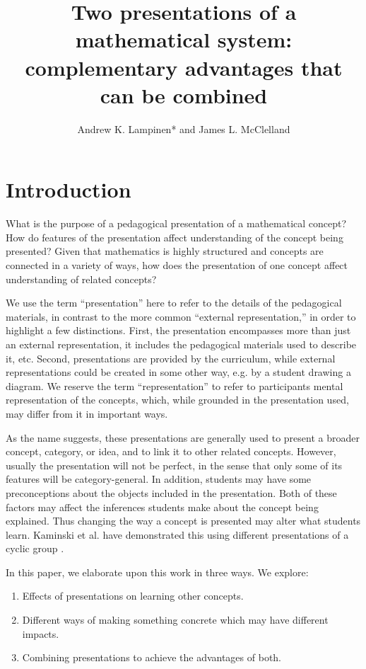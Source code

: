\documentclass[man,10pt]{apa6}
\title{Two presentations of a mathematical system: complementary advantages that can be combined}
\author{Andrew K. Lampinen* and James L. McClelland}
\affiliation{Department of Psychology, Stanford University}
\date{}
\begin{document}
\maketitle
\section{Introduction}
What is the purpose of a pedagogical presentation of a mathematical concept? How do features of the presentation affect understanding of the concept being presented? Given that mathematics is highly structured and concepts are connected in a variety of ways, how does the presentation of one concept affect understanding of related concepts?  \par
We use the term ``presentation'' here to refer to the details of the pedagogical materials, in contrast to the more common ``external representation,'' in order to highlight a few distinctions. First, the presentation encompasses more than just an external representation, it includes the pedagogical materials used to describe it, etc. Second, presentations are provided by the curriculum, while external representations could be created in some other way, e.g. by a student drawing a diagram. We reserve the term ``representation'' to refer to participants mental representation of the concepts, which, while grounded in the presentation used, may differ from it in important ways. \par
As the name suggests, these presentations are generally used to present a broader concept, category, or idea, and to link it to other related concepts. However, usually the presentation will not be perfect, in the sense that only some of its features will be category-general. In addition, students may have some preconceptions about the objects included in the presentation. Both of these factors may affect the inferences students make about the concept being explained. Thus changing the way a concept is presented may alter what students learn. Kaminski et al. have demonstrated this using different presentations of a cyclic group \cite{Kaminski2008}. \par
In this paper, we elaborate upon this work in three ways. We explore:
\begin{enumerate}
\item Effects of presentations on learning other concepts.
\item Different ways of making something concrete which may have different impacts. 
\item Combining presentations to achieve the advantages of both.
\end{enumerate}
\end{document}
